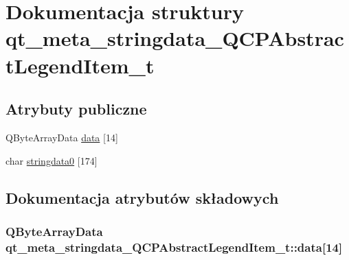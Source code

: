 \hypertarget{structqt__meta__stringdata___q_c_p_abstract_legend_item__t}{}\section{Dokumentacja struktury qt\+\_\+meta\+\_\+stringdata\+\_\+\+Q\+C\+P\+Abstract\+Legend\+Item\+\_\+t}
\label{structqt__meta__stringdata___q_c_p_abstract_legend_item__t}
\subsection*{Atrybuty publiczne}
\begin{DoxyCompactItemize}
\item 
Q\+Byte\+Array\+Data \hyperlink{structqt__meta__stringdata___q_c_p_abstract_legend_item__t_afedc8a30b9d66c03673486e9c892c35b}{data} \mbox{[}14\mbox{]}
\item 
char \hyperlink{structqt__meta__stringdata___q_c_p_abstract_legend_item__t_a4987f6d279add0af922402e1f2e28b6b}{stringdata0} \mbox{[}174\mbox{]}
\end{DoxyCompactItemize}


\subsection{Dokumentacja atrybutów składowych}
\subsubsection[{\texorpdfstring{data}{data}}]{\setlength{\rightskip}{0pt plus 5cm}Q\+Byte\+Array\+Data qt\+\_\+meta\+\_\+stringdata\+\_\+\+Q\+C\+P\+Abstract\+Legend\+Item\+\_\+t\+::data\mbox{[}14\mbox{]}}\hypertarget{structqt__meta__stringdata___q_c_p_abstract_legend_item__t_afedc8a30b9d66c03673486e9c892c35b}{}\label{structqt__meta__stringdata___q_c_p_abstract_legend_item__t_afedc8a30b9d66c03673486e9c892c35b}
